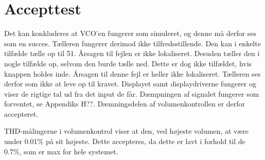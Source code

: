 \section{Accepttest}
\label{volumenkontrol-accepttest}
Det kan konkluderes at VCO'en fungerer som simuleret, og denne må derfor ses som en succes. Tælleren fungerer derimod ikke tilfredsstillende. Den kan i enkelte tilfælde tælle op til 51. Årsagen til fejlen er ikke lokaliseret. Desuden tæller den i nogle tilfælde op, selvom den burde tælle ned. Dette er dog ikke tilfældet, hvis knappen holdes inde. Årsagen til denne fejl er heller ikke lokaliseret. Tælleren ses derfor som ikke at leve op til kravet. Displayet samt displaydriverne fungerer og viser de rigtige tal ud fra det input de får.
Dæmpningen af signalet fungerer som forventet, se Appendiks H??. Dæmningsdelen af volumenkontrollen er derfor accepteret.

THD-målingerne i volumenkontrol viser at den, ved højeste volumen, at være under 0.01\% på sit højeste. Dette accepteres, da dette er lavt i forhold til de 0.7\%, som er max for hele systemet.